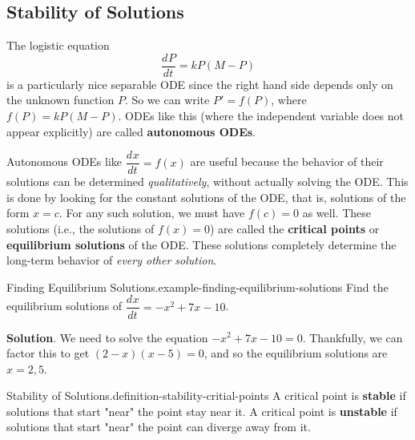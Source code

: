 \documentclass[10pt,]{book}
\newcommand{\terminology}[1]{\textbf{#1}}
\numberwithin{equation}{section}
\newcommand{\dv}[3][]{\dfrac{d^{#1} #2}{d #3^{#1}}}
\begin{document}
\subsection[{Stability of Solutions}]{Stability of Solutions}\label{subsection-stability-of-solutions}
\hypertarget{p-752}{}%
The logistic equation%
\begin{equation*}
\dv{P}{t} = kP(M-P)
\end{equation*}
is a particularly nice separable ODE since the right hand side depends only on the unknown function \(P\). So we can write \(P' = f(P)\), where \(f(P) = kP(M-P)\). ODEs like this (where the independent variable does not appear explicitly) are called \terminology{autonomous ODEs}.%
\par
\hypertarget{p-753}{}%
Autonomous ODEs like \(\dv{x}{t} = f(x)\) are useful because the behavior of their solutions can be determined \emph{qualitatively}, without actually solving the ODE. This is done by looking for the constant solutions of the ODE, that is, solutions of the form \(x = c\). For any such solution, we must have \(f(c) = 0\) as well. These solutions (i.e., the solutions of \(f(x) = 0\)) are called the \terminology{critical points} or \terminology{equilibrium solutions} of the ODE. These solutions completely determine the long-term behavior of \emph{every other solution}.%
\begin{example}{Finding Equilibrium Solutions.}{example-finding-equilibrium-solutions}%
\hypertarget{p-754}{}%
Find the equilibrium solutions of \(\dv{x}{t} = -x^{2} + 7x - 10\).%
\par\smallskip%
\noindent\textbf{Solution}.\hypertarget{solution-158}{}\quad%
\hypertarget{p-755}{}%
We need to solve the equation \(-x^{2} + 7x - 10 = 0\). Thankfully, we can factor this to get \((2-x)(x-5) = 0\), and so the equilibrium solutions are \(x = 2,5\).%
\end{example}
\begin{definition}{Stability of Solutions.}{definition-stability-critial-points}%
\hypertarget{p-756}{}%
A critical point is \terminology{stable} if solutions that start "near" the point stay near it. A critical point is \terminology{unstable} if solutions that start "near" the point can diverge away from it.%
\end{definition}
\end{document}
